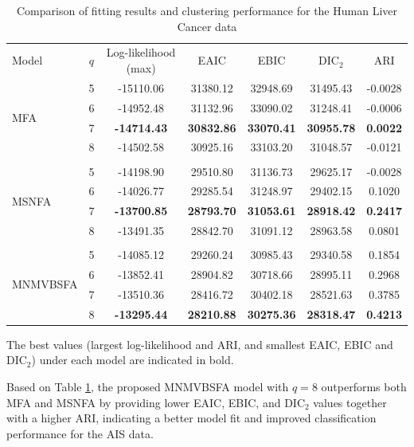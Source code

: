 \documentclass[twoside]{article}
\theoremstyle{definition}
\begin{document}
\begin{table}[!ht]
	\centering
	\caption{Comparison of fitting results and clustering performance for the Human Liver Cancer data}
	\begin{tabular}{lcccccc}
		\hline
		Model & $q$ & Log-likelihood (max) & EAIC & EBIC & DIC$_2$ & ARI \\
		
		\multirow{4}{*}{MFA}
		& 5 & -15110.06 & 31380.12 & 32948.69 & 31495.43 & -0.0028 \\
		& 6 & -14952.48 & 31132.96 & 33090.02 & 31248.41 & -0.0006 \\
		& 7 & \textbf{-14714.43} & \textbf{30832.86} & \textbf{33070.41} & \textbf{30955.78} & \textbf{0.0022} \\
		& 8 & -14502.58 & 30925.16 & 33103.20 & 31048.57 & -0.0121 \\
		\\
		\multirow{4}{*}{MSNFA}
		& 5 & -14198.90 & 29510.80 & 31136.73 & 29625.17 & -0.0028 \\
		& 6 & -14026.77 & 29285.54 & 31248.97 & 29402.15 & 0.1020 \\
		& 7 & \textbf{-13700.85} & \textbf{28793.70} & \textbf{31053.61} & \textbf{28918.42} & \textbf{0.2417} \\
		& 8 & -13491.35 & 28842.70 & 31091.12 & 28963.58 & 0.0801 \\
		\\
		\multirow{4}{*}{MNMVBSFA}
		& 5 & -14085.12 & 29260.24 & 30985.43 & 29340.58 & 0.1854 \\
		& 6 & -13852.41 & 28904.82 & 30718.66 & 28995.11 & 0.2968 \\
		& 7 & -13510.36 & 28416.72 & 30402.18 & 28521.63 & 0.3785 \\
		& 8 & \textbf{-13295.44} & \textbf{28210.88} & \textbf{30275.36} & \textbf{28318.47} & \textbf{0.4213} \\
		\hline
		
	\end{tabular}
	
	\vspace{0.2cm}
	{\footnotesize The best values (largest log-likelihood and ARI, and smallest EAIC, EBIC and DIC$_2$) under each model are indicated in bold.}
	\label{tab:liver_comparison}
\end{table}
Based on Table \ref{tab:liver_comparison}, the proposed MNMVBSFA model with $ q=8 $ outperforms both MFA and MSNFA by providing lower EAIC, EBIC, and DIC$_2$ values together with a higher ARI, indicating a better model fit and improved classification performance for the AIS data.
\end{document}
